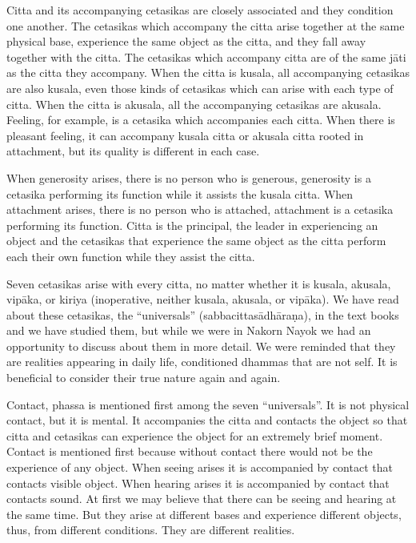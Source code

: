 Citta and its accompanying cetasikas are closely associated and they
condition one another. The cetasikas which accompany the citta arise
together at the same physical base, experience the same object as the
citta, and they fall away together with the citta. The cetasikas which
accompany citta are of the same jāti as the citta they accompany. When
the citta is kusala, all accompanying cetasikas are also kusala, even
those kinds of cetasikas which can arise with each type of citta. When
the citta is akusala, all the accompanying cetasikas are akusala.
Feeling, for example, is a cetasika which accompanies each citta. When
there is pleasant feeling, it can accompany kusala citta or akusala
citta rooted in attachment, but its quality is different in each case.

When generosity arises, there is no person who is generous, generosity
is a cetasika performing its function while it assists the kusala citta.
When attachment arises, there is no person who is attached, attachment
is a cetasika performing its function. Citta is the principal, the
leader in experiencing an object and the cetasikas that experience the
same object as the citta perform each their own function while they
assist the citta.

Seven cetasikas arise with every citta, no matter whether it is kusala,
akusala, vipāka, or kiriya (inoperative, neither kusala, akusala, or
vipāka). We have read about these cetasikas, the ``universals''
(sabbacittasādhāraṇa), in the text books and we have studied them, but
while we were in Nakorn Nayok we had an opportunity to discuss about
them in more detail. We were reminded that they are realities appearing
in daily life, conditioned dhammas that are not self. It is beneficial
to consider their true nature again and again.

Contact, phassa is mentioned first among the seven ``universals''. It is
not physical contact, but it is mental. It accompanies the citta and
contacts the object so that citta and cetasikas can experience the
object for an extremely brief moment. Contact is mentioned first because
without contact there would not be the experience of any object. When
seeing arises it is accompanied by contact that contacts visible object.
When hearing arises it is accompanied by contact that contacts sound. At
first we may believe that there can be seeing and hearing at the same
time. But they arise at different bases and experience different
objects, thus, from different conditions. They are different realities.

